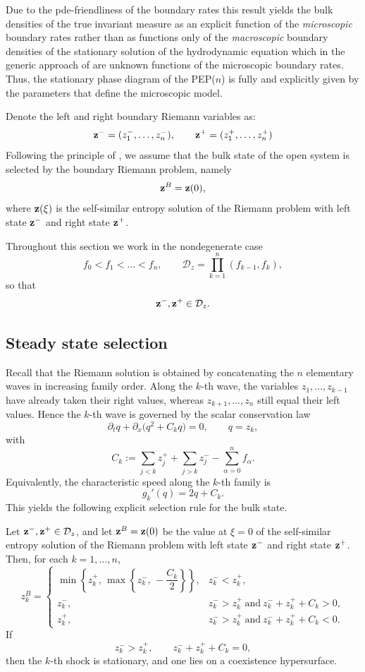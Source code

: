 \documentclass[12pt]{article}
\newtheorem{theorem}{Theorem}
\begin{document}
Due to the pde-friendliness of the boundary rates
this result yields the bulk densities of the
true invariant measure as an explicit function of the {\it microscopic}
boundary rates
rather than as functions only of the {\it macroscopic} boundary densities
of the stationary solution of the hydrodynamic equation
which in the generic approach of \cite{Cant24} are unknown functions of the microscopic boundary rates. Thus, the stationary phase diagram of the
PEP($n$) is fully and explicitly given by the parameters that define the
microscopic model. 


Denote the left and right boundary Riemann variables as:
\[
{\bf z}^-=(z_1^-,\dots,z_n^-),\qquad
{\bf z}^+=(z_1^+,\dots,z_n^+)
\]
Following the principle of \cite{Cant24}, we assume that
the bulk state of the open system is selected by the boundary Riemann
problem, namely
\[
{\bf z}^B={\bf z}(0),
\]
where ${\bf z}(\xi)$ is the self-similar entropy solution of the Riemann problem
with left state ${\bf z}^-$ and right state ${\bf z}^+$.

Throughout this section we work in the nondegenerate case
\[
f_0<f_1<\dots<f_n,
\qquad
\mathcal D_z=\prod_{k=1}^n (f_{k-1},f_k),
\]
so that
\[
{\bf z}^-,{\bf z}^+\in\mathcal D_z.
\]

\subsection{Steady state selection}

Recall that the Riemann solution is obtained by concatenating the $n$
elementary waves in increasing family order. Along the $k$-th wave, the
variables $z_1,\dots,z_{k-1}$ have already taken their right values,
whereas $z_{k+1},\dots,z_n$ still equal their left values. Hence the
$k$-th wave is governed by the scalar conservation law
\[
\partial_t q+\partial_x\bigl(q^2+C_k q\bigr)=0,
\qquad q=z_k,
\]
with
\[
C_k:=\sum_{j<k} z_j^+ + \sum_{j>k} z_j^- - \sum_{\alpha=0}^n f_\alpha.
\]
Equivalently, the characteristic speed along the $k$-th family is
\[
g_k'(q)=2q+C_k.
\]
This yields the following explicit selection rule for the bulk state.

Let ${\bf z}^-,{\bf z}^+\in\mathcal D_z$, and let \({\bf z}^B={\bf z}(0)\) be the value at $\xi=0$ of
the self-similar entropy solution of the Riemann problem with left state
${\bf z}^-$ and right state ${\bf z}^+$. Then, for each $k=1,\dots,n$,
\begin{equation}
z_k^B =
\begin{cases}
\min\!\left\{ z_k^+,\, \max\!\left\{ z_k^-,\, -\dfrac{C_k}{2} \right\} \right\},
& z_k^- < z_k^+, \\[3mm]
z_k^-,
& z_k^- > z_k^+ \ \text{and}\ z_k^- + z_k^+ + C_k > 0, \\[1mm]
z_k^+,
& z_k^- > z_k^+ \ \text{and}\ z_k^- + z_k^+ + C_k < 0.
\label{thm:open-bulk-selection}
\end{cases}
\end{equation}
If
\[
z_k^->z_k^+,
\qquad
z_k^-+z_k^+ + C_k=0,
\]
then the $k$-th shock is stationary, and one lies on a coexistence
hypersurface.
\end{document}
